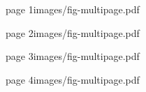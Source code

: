  
\pdfximage page 1{images/fig-multipage.pdf}\pdfrefximage\pdflastximage\par
\pdfximage page 2{images/fig-multipage.pdf}\pdfrefximage\pdflastximage\par
\pdfximage page 3{images/fig-multipage.pdf}\pdfrefximage\pdflastximage\par
\message{[pages=\the\pdflastximagepages]}
\pdfximage page 4{images/fig-multipage.pdf}
\bye
